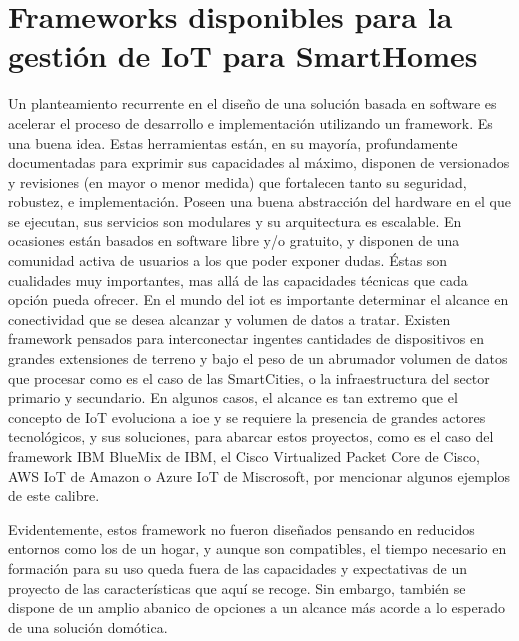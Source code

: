 \section{Frameworks disponibles para la gestión de IoT para SmartHomes}
\label{ch:Capitulo2.2}

Un planteamiento recurrente en el diseño de una solución basada en software es acelerar el proceso de desarrollo e implementación utilizando un \gls{framework}. Es una buena idea. Estas herramientas están, en su mayoría, profundamente documentadas para exprimir sus capacidades al máximo, disponen de versionados y revisiones (en mayor o menor medida) que fortalecen tanto su seguridad, robustez, e implementación. Poseen una buena abstracción del hardware en el que se ejecutan, sus servicios son modulares y su arquitectura es escalable. En ocasiones están basados en software libre y/o gratuito, y disponen de una comunidad activa de usuarios a los que poder exponer dudas. Éstas son cualidades muy importantes, mas allá de las capacidades técnicas que cada opción pueda ofrecer.
En el mundo del \gls{iot} es importante determinar el alcance en conectividad que se desea alcanzar y volumen de datos a tratar. Existen \gls{framework} pensados para interconectar ingentes cantidades de dispositivos en grandes extensiones de terreno y bajo el peso de un abrumador volumen de datos que procesar como es el caso de las SmartCities, o la infraestructura del sector primario y secundario. En algunos casos, el alcance es tan extremo que el concepto de IoT evoluciona a \gls{ioe} y se requiere la presencia de grandes actores tecnológicos, y sus soluciones, para abarcar estos proyectos, como es el caso del framework IBM BlueMix de IBM, el Cisco Virtualized Packet Core de Cisco, AWS IoT de Amazon o Azure IoT de Miscrosoft, por mencionar algunos ejemplos de este calibre.

\vspace{1cm}

Evidentemente, estos \gls{framework} no fueron diseñados pensando en reducidos entornos como los de un hogar, y aunque son compatibles, el tiempo necesario en formación para su uso queda fuera de las capacidades y expectativas de un proyecto de las características que aquí se recoge. Sin embargo, también se dispone de un amplio abanico de opciones a un alcance más acorde a lo esperado de una solución domótica.

\vspace{1cm}

